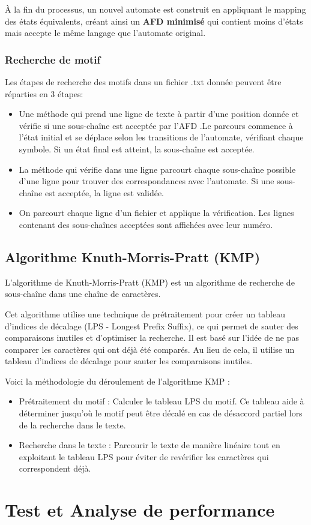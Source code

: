 \documentclass{article}
\begin{document}
À la fin du processus, un nouvel automate est construit en appliquant le mapping des états équivalents, créant ainsi un \textbf{AFD minimisé} qui contient moins d'états mais accepte le même langage que l’automate original.

\subsubsection{Recherche de motif}
Les étapes de recherche des motifs dans un fichier .txt donnée peuvent être réparties en 3 étapes:

\begin{itemize}
    \item Une méthode qui  prend une ligne de texte à partir d'une position donnée et vérifie si une sous-chaîne est acceptée par l'AFD .Le parcours commence à l’état initial et se déplace selon les transitions de l’automate, vérifiant chaque symbole. Si un état final est atteint, la sous-chaîne est acceptée.
    \item La méthode qui vérifie dans une ligne parcourt chaque sous-chaîne possible d’une ligne pour trouver des correspondances avec l’automate. Si une sous-chaîne est acceptée, la ligne est validée.
    \item On parcourt chaque ligne d’un fichier et applique la vérification. Les lignes contenant des sous-chaînes acceptées sont affichées avec leur numéro.
\end{itemize}

\subsection{Algorithme Knuth-Morris-Pratt (KMP)}
L'algorithme de Knuth-Morris-Pratt (KMP) est un algorithme de recherche de sous-chaîne dans une chaîne de caractères.

Cet algorithme utilise une technique de prétraitement pour créer un tableau d'indices de décalage (LPS - Longest Prefix Suffix), ce qui permet de sauter des comparaisons inutiles et d'optimiser la recherche. Il est basé sur l'idée de ne pas comparer les caractères qui ont déjà été comparés. Au lieu de cela, il utilise un tableau d'indices de décalage pour sauter les comparaisons inutiles.

Voici la méthodologie du déroulement de l’algorithme KMP :

\begin{itemize}
    \item Prétraitement du motif : Calculer le tableau LPS du motif. Ce tableau aide à déterminer jusqu'où le motif peut être décalé en cas de désaccord partiel lors de la recherche dans le texte.
    \item Recherche dans le texte : Parcourir le texte de manière linéaire tout en exploitant le tableau LPS pour éviter de revérifier les caractères qui correspondent déjà.
\end{itemize}

\section{Test et Analyse de performance}

\newpage


\end{document}
